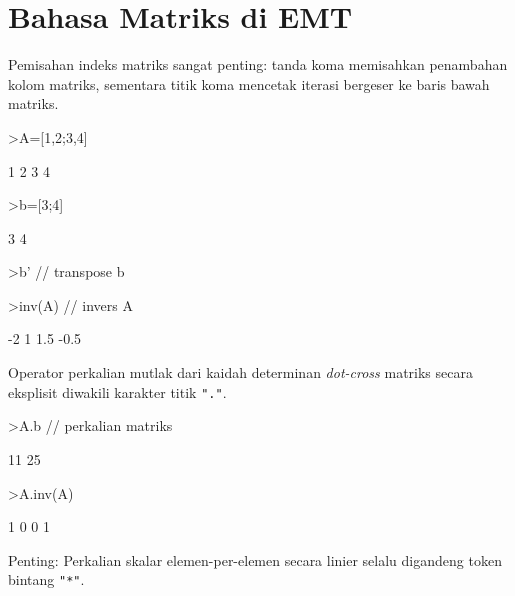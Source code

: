 \documentclass[a4paper,11pt,oneside,enabledeprecatedfontcommands]{scrbook}
\newenvironment{eulernotebook}{}{}
\newcommand{\eulerheading}[1]{\chapter{#1}}
\newenvironment{eulercomment}{\par\medskip\noindent}{\par\medskip}
\begin{document}
\begin{eulernotebook}
\eulerheading{Bahasa Matriks di EMT}
\begin{eulercomment}
Pemisahan indeks matriks sangat penting: tanda koma memisahkan penambahan kolom matriks, sementara titik koma mencetak iterasi bergeser ke baris bawah matriks.
\end{eulercomment}
\begin{eulerprompt}
>A=[1,2;3,4]
\end{eulerprompt}
\begin{euleroutput}
            1             2 
            3             4 
\end{euleroutput}
\begin{eulerprompt}
>b=[3;4]
\end{eulerprompt}
\begin{euleroutput}
            3 
            4 
\end{euleroutput}
\begin{eulerprompt}
>b' // transpose b
\end{eulerprompt}
\begin{euleroutput}
[3,  4]
\end{euleroutput}
\begin{eulerprompt}
>inv(A) // invers A
\end{eulerprompt}
\begin{euleroutput}
           -2             1 
          1.5          -0.5 
\end{euleroutput}
\begin{eulercomment}
Operator perkalian mutlak dari kaidah determinan \emph{dot-cross} matriks secara eksplisit diwakili karakter titik \texttt{"."}.
\end{eulercomment}
\begin{eulerprompt}
>A.b // perkalian matriks
\end{eulerprompt}
\begin{euleroutput}
           11 
           25 
\end{euleroutput}
\begin{eulerprompt}
>A.inv(A)
\end{eulerprompt}
\begin{euleroutput}
            1             0 
            0             1 
\end{euleroutput}
\begin{eulercomment}
Penting: Perkalian skalar elemen-per-elemen secara linier selalu digandeng token bintang \texttt{"*"}.
\end{eulercomment}
\begin{eulerprompt}

\end{eulerprompt}
\end{eulernotebook}
\end{document}
